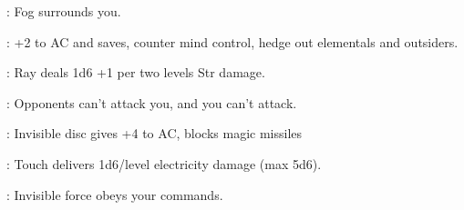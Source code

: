 \begin{multicols}{2}
\begin{description*}
\item[\linkspell{Obscuring Mist}:] Fog surrounds you.
\item[\linkspell{Protection from Good}:] +2 to AC and saves, counter mind control, hedge out elementals and outsiders.
\item[\linkspell{Ray of Enfeeblement}:] Ray deals 1d6 +1 per two levels Str damage.
\item[\linkspell{Sanctuary}:] Opponents can't attack you, and you can't attack.
\item[\linkspell{Shield}:] Invisible disc gives +4 to AC, blocks magic missiles
\item[\linkspell{Shocking Grasp}:] Touch delivers 1d6/level electricity damage (max 5d6).
\item[\linkspell{Unseen Servant}:] Invisible force obeys your commands.
\end{description*}


\end{multicols}
